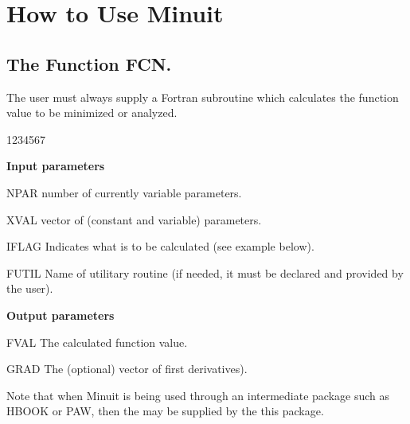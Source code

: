  
\chapter{How to Use Minuit}

\section{The Function FCN.}
The user must always supply a Fortran subroutine which calculates
the function value to be minimized or analyzed.
\medskip
{}

\begin{DLtt}{1234567}
\item[{\rm\bf Input parameters}] \mbox{}
\item[NPAR]  number of currently variable parameters.
\item[XVAL]  vector of (constant and variable) parameters.
\item[IFLAG] Indicates what is to be calculated (see example below).
\item[FUTIL] Name of utilitary routine (if needed, it
             must be declared  and provided by the user).
\item[{\rm\bf Output parameters}] \mbox{}
\item[FVAL]  The calculated function value.
\item[GRAD]  The (optional) vector of first derivatives).
\end{DLtt}

Note that when Minuit is being used through an intermediate package such as
HBOOK or PAW, then the  may be supplied by the this package.

